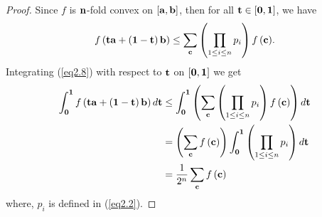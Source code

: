 \documentclass{amsart}
\theoremstyle{plain}
\numberwithin{equation}{section}
\begin{document}
\begin{proof}
Since $f$ is ${\bf{n}}$-fold convex on $\left[ {{\bf{a}},{\bf{b}}}
\right]$, then for all ${\bf{t}} \in \left[{{\bf{0}},{\bf{1}}}
\right]$, we have
\begin{align}
\label{eq2.8}f\left( {{\bf{ta}} + \left( {{\bf{1}} - {\bf{t}}}
\right){\bf{b}}} \right) \le \sum\limits_{\bf{c}} {\left(
{\prod\limits_{1 \le i \le n} {p_i } } \right)f\left( {\bf{c}}
\right)}.
\end{align}
Integrating (\ref{eq2.8}) with respect to ${\bf{t}}$ on $\left[
{{\bf{0}},{\bf{1}}} \right]$ we get
\begin{align}
\int_{\bf{0}}^{\bf{1}} {f\left( {{\bf{ta}} + \left( {{\bf{1}} -
{\bf{t}}} \right){\bf{b}}} \right)d{\bf{t}}}  &\le
\int_{\bf{0}}^{\bf{1}} {\left( {\sum\limits_{\bf{c}} {\left(
{\prod\limits_{1 \le i \le n} {p_i } } \right)f\left( {\bf{c}}
\right)} } \right)d{\bf{t}}}
\nonumber\\
&=\left( {\sum\limits_{\bf{c}} {f\left( {\bf{c}} \right)} }
\right)\int_{\bf{0}}^{\bf{1}} {\left( {\prod\limits_{1 \le i \le
n} {p_i } } \right)d{\bf{t}}}
\nonumber\\
&= \frac{1}{{2^n }}\sum\limits_{\bf{c}} {f\left( {\bf{c}}
\right)}\label{eq2.9}
\end{align}
where, $p_i$ is defined in (\ref{eq2.2}).


\end{proof}
\end{document}
